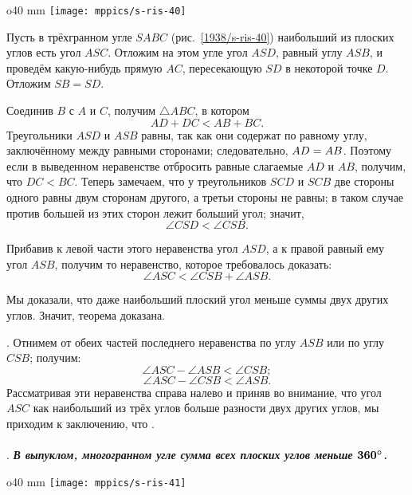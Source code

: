 \begin{wrapfigure}{o}{40 mm}
\vskip-0mm
\centering
\texttt{[image: mppics/s-ris-40]}
\caption{}\label{1938/s-ris-40}
\end{wrapfigure}

Пусть в трёхгранном угле $SABC$ (рис.~\ref{1938/s-ris-40}) наибольший из плоских углов есть угол $ASC$.
Отложим на этом угле угол $ASD$, равный углу $ASB$, и проведём какую-нибудь прямую $AC$, пересекающую $SD$ в некоторой точке $D$.
Отложим $SB=SD$.

Соединив $B$ с $A$ и $C$, получим $\triangle ABC$, в котором
\[AD + DC < AB + BC.\]
Треугольники $ASD$ и $ASB$ равны, так как они содержат по равному углу, заключённому между равными сторонами;
следовательно, $AD \z=AB$.
Поэтому если в выведенном неравенстве отбросить равные слагаемые $AD$ и $AB$, получим, что $DC<BC$.
Теперь замечаем, что у треугольников $SCD$ и $SCB$ две стороны одного равны двум сторонам другого, а третьи стороны не равны;
в таком случае против большей из этих сторон лежит больший угол;
значит,
\[\angle CSD < \angle CSB.\]

Прибавив к левой части этого неравенства угол $ASD$, а к правой равный ему угол $ASB$, получим то неравенство, которое требовалось доказать:
\[\angle ASC < \angle CSB + \angle ASB.\]

Мы доказали, что даже наибольший плоский угол меньше суммы двух других углов.
Значит, теорема доказана.

\medskip

.
Отнимем от обеих частей последнего неравенства по углу $ASB$ или по углу $CSB$;
получим:
\[\angle ASC - \angle ASB < \angle CSB;\]
\[\angle ASC - \angle CSB < \angle ASB.\]
Рассматривая эти неравенства справа налево и приняв во внимание, что угол $ASC$ как наибольший из трёх углов больше разности двух других углов, мы приходим к заключению, что .

\paragraph{}\label{1938/s51}
.
\textbf{\emph{В выпуклом, многогранном угле сумма всех плоских углов меньше $\bm{360\degree}$.}}

\begin{wrapfigure}{o}{40 mm}
\vskip-4mm
\centering
\texttt{[image: mppics/s-ris-41]}
\caption{}\label{1938/s-ris-41}
\end{wrapfigure}

